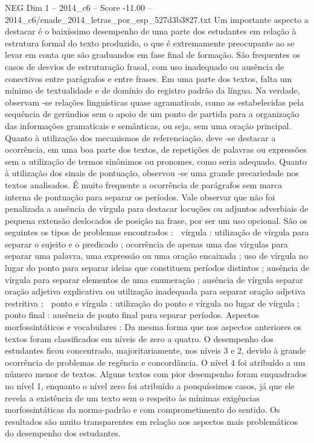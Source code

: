 \begin{textsample}{NEG Dim 1 – 2014\_c6 – Score -11.00 – 2014\_c6/enade\_2014\_letras\_por\_esp\_527d3b3827.txt}
Um importante aspecto a destacar é o baixíssimo desempenho de uma parte dos estudantes em relação à estrutura formal do texto produzido, o que é extremamente preocupante ao se levar em conta que são graduandos em fase final de formação.
São frequentes os casos de desvios de estruturação frasal, com uso inadequado ou ausência de conectivos entre parágrafos e entre frases.
Em uma parte dos textos, falta um mínimo de textualidade e de domínio do registro padrão da língua.
Na verdade, observam -se relações linguísticas quase agramaticais, como as estabelecidas pela sequência de gerúndios sem o apoio de um ponto de partida para a organização das informações gramaticais e semânticas, ou seja, sem uma oração principal.
Quanto à utilização dos mecanismos de referenciação, deve -se destacar a ocorrência, em uma boa parte dos textos, de repetições de palavras ou expressões sem a utilização de termos sinônimos ou pronomes, como seria adequado.
Quanto à utilização dos sinais de pontuação, observou -se uma grande precariedade nos textos analisados.
É muito frequente a ocorrência de parágrafos sem marca interna de pontuação para separar os períodos.
Vale observar que não foi penalizada a ausência de vírgula para destacar locuções ou adjuntos adverbiais de pequena extensão deslocados de posição na frase, por ser um uso opcional.
São os seguintes os tipos de problemas encontrados :  vírgula : utilização de vírgula para separar o sujeito e o predicado ; ocorrência de apenas uma das vírgulas para separar uma palavra, uma expressão ou uma oração encaixada ; uso de vírgula no lugar do ponto para separar ideias que constituem períodos distintos ; ausência de vírgula para separar elementos de uma enumeração ; ausência de vírgula separar oração adjetiva explicativa ou utilização inadequada para separar oração adjetiva restritiva ;  ponto e vírgula : utilização do ponto e vírgula no lugar de vírgula ;  ponto final : ausência de ponto final para separar períodos.
Aspectos morfossintáticos e vocabulares : Da mesma forma que nos aspectos anteriores os textos foram classificados em níveis de zero a quatro.
O desempenho dos estudantes ficou concentrado, majoritariamente, nos níveis 3 e 2, devido à grande ocorrência de problemas de regência e concordância.
O nível 4 foi atribuído a um número menor de textos.
Alguns textos com pior desempenho foram enquadrados no nível 1, enquanto o nível zero foi atribuído a pouquíssimos casos, já que ele revela a existência de um texto sem o respeito às mínimas exigências morfossintáticas da norma-padrão e com comprometimento do sentido.
Os resultados são muito transparentes em relação aos aspectos mais problemáticos do desempenho dos estudantes.

\end{textsample}
